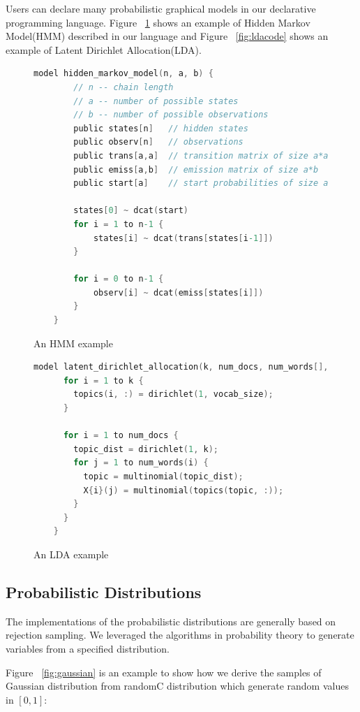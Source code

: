 Users can declare many probabilistic graphical models in our declarative programming language. Figure ~\ref{fig:hmm} shows an example of Hidden Markov Model(HMM) described in our language and Figure ~\ref{fig:ldacode} shows an example of Latent Dirichlet Allocation(LDA).

\begin{figure}
  \begin{lstlisting}[language=C]
    model hidden_markov_model(n, a, b) {
        // n -- chain length
        // a -- number of possible states
        // b -- number of possible observations
        public states[n]   // hidden states
        public observ[n]   // observations
        public trans[a,a]  // transition matrix of size a*a
        public emiss[a,b]  // emission matrix of size a*b
        public start[a]    // start probabilities of size a

        states[0] ~ dcat(start)
        for i = 1 to n-1 {
            states[i] ~ dcat(trans[states[i-1]])
        }

        for i = 0 to n-1 {
            observ[i] ~ dcat(emiss[states[i]])
        }
    }
  \end{lstlisting}
  \caption{An HMM example}
  \label{fig:hmm}
\end{figure}

\begin{figure}
  \begin{lstlisting}[language=C]
    model latent_dirichlet_allocation(k, num_docs, num_words[], vocab_size) {
      for i = 1 to k {
        topics(i, :) = dirichlet(1, vocab_size);
      }
      
      for i = 1 to num_docs {
        topic_dist = dirichlet(1, k);
        for j = 1 to num_words(i) {
          topic = multinomial(topic_dist);
          X{i}(j) = multinomial(topics(topic, :));
        }
      }
    }
  \end{lstlisting}
  \caption{An LDA example}
  \label{fig:lda}
\end{figure}
\subsection{Probabilistic Distributions}
The implementations of the probabilistic distributions are generally based on rejection sampling. We leveraged the algorithms in probability theory to generate variables from a specified distribution.

Figure ~\ref{fig:gaussian} is an example to show how we derive the samples of Gaussian distribution from randomC distribution which generate random values in $[0, 1]$:

